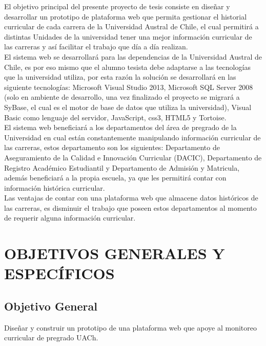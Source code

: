 \documentclass[12pt]{article}
\begin{document}
			El objetivo principal del presente proyecto de tesis consiste en diseñar y desarrollar un prototipo de 
			plataforma web que permita gestionar el historial curricular de cada carrera de la Universidad Austral 
			de Chile, el cual permitirá a distintas Unidades de la universidad tener una mejor información curricular 
			de las carreras y así facilitar el trabajo que día a día realizan.
			\\

			
			El sistema web se desarrollará para las dependencias de la Universidad Austral de Chile, es por eso mismo que
			el alumno tesista debe adaptarse a las tecnologías que la universidad utiliza, por esta razón la solución se 
			desarrollará en las siguiente tecnologías: Microsoft Visual Studio 2013, Microsoft SQL Server 2008 
			(solo en ambiente de desarrollo, una vez finalizado el proyecto se migrará a SyBase, el cual es el motor 
			de base de datos que utiliza la universidad), Visual Basic como lenguaje del servidor, JavaScript, css3, HTML5 
			y Tortoise.
			\\

			
			El sistema web beneficiará a los departamentos del área de pregrado de la Universidad en cual están 
			constantemente manipulando información curricular de las carreras, estos departamento son los siguientes: 
			Departamento de Aseguramiento de la Calidad e Innovación Curricular (DACIC), Departamento de Registro 
			Académico Estudiantil y  Departamento de Admisión y Matricula, además beneficiará a la propia escuela, ya que les permitirá contar con
			información histórica curricular.
			\\
			
			Las ventajas de contar con una plataforma web que almacene datos históricos de las carreras, es disminuir el 
			trabajo que poseen estos departamentos al momento de requerir alguna información curricular.

			
			


\newpage
\section{OBJETIVOS GENERALES Y ESPECÍFICOS}
		\subsection{Objetivo General}
			{\large  Diseñar y construir  un prototipo de una plataforma web que apoye al monitoreo curricular de pregrado 
			UACh.}
\end{document}
